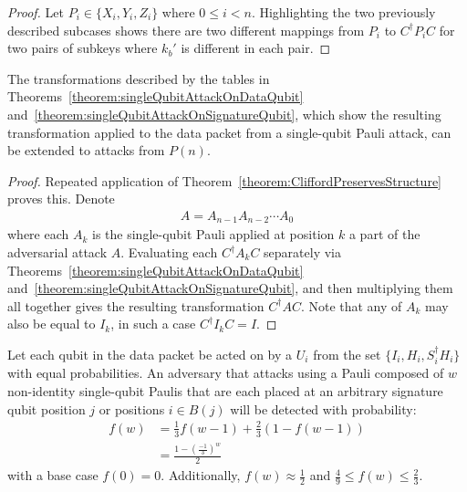 \begin{proof}
Let $P_i \in \{X_i, Y_i, Z_i\}$ where $0 \leq i < n$. Highlighting the two previously described subcases shows there are two different mappings from $P_{i}$ to $C^{\dagger} P_i C$ for two pairs of subkeys where $k_b'$ is different in each pair.
\end{proof}

\begin{theorem}
\label{theorem:extendingSingleQubitAttackToMultiQubitAttack}
The transformations described by the tables in Theorems~\ref{theorem:singleQubitAttackOnDataQubit} and~\ref{theorem:singleQubitAttackOnSignatureQubit}, which show the resulting transformation applied to the data packet from a single-qubit Pauli attack, can be extended to attacks from $P(n)$.
\end{theorem}
\begin{proof}
Repeated application of Theorem~\ref{theorem:CliffordPreservesStructure} proves this. Denote 
\begin{align}
A = A_{n-1}A_{n-2} \cdots A_{0}
\end{align}
where each $A_k$ is the single-qubit Pauli applied at position $k$ a part of the adversarial attack $A$. Evaluating each $C^{\dagger}A_kC$ separately via Theorems~\ref{theorem:singleQubitAttackOnDataQubit} and~\ref{theorem:singleQubitAttackOnSignatureQubit}, and then multiplying them all together gives the resulting transformation $C^{\dagger}AC$. Note that any of $A_k$ may also be equal to $I_k$, in such a case $C^{\dagger}I_kC = I$.
\end{proof}
\begin{theorem}
\label{theorem:probabilityOfMultiQubitDetectionOnSingleBlock}
Let each qubit in the data packet be acted on by a $U_i$ from the set $\{I_i, H_i, S_i^{\dagger}H_i\}$ with equal probabilities. An adversary that attacks using a Pauli composed of $w$ non-identity single-qubit Paulis that are each placed at an arbitrary signature qubit position $j$ or positions $i \in B(j)$ will be detected with probability:
\begin{align}
f(w) &= \frac{1}{3}f(w - 1) + \frac{2}{3}(1 - f(w - 1)) \label{eq:probabilityOfMultiQubitDetectionOnSingleBlock}\\
&= \frac{1-\left(\frac{-1}{3}\right)^w}{2} 
\end{align}
with a base case $f(0) = 0$. Additionally, $f(w) \approx \frac{1}{2}$ and $\frac{4}{9} \leq f(w) \leq \frac{2}{3}$.
\end{theorem}

